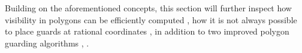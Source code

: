 Building on the aforementioned concepts, this section will further inspect how visibility in polygons can be efficiently computed \cite{DBLP:journals/corr/BungiuHHHK14}, how it is not always possible to place guards at rational coordinates \cite{abrahamsen2021art}, in addition to two improved polygon guarding algorithms \cite{maleki2022implementation}, \cite{DBLP:journals/corr/abs-2007-06920}.





\newpage

